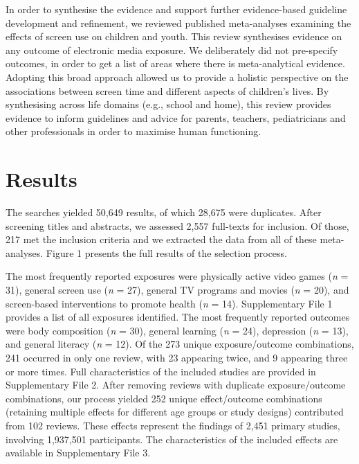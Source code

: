 \documentclass[
  english,
  man]{apa6}
\begin{document}
In order to synthesise the evidence and support further evidence-based guideline development and refinement, we reviewed published meta-analyses examining the effects of screen use on children and youth.
This review synthesises evidence on any outcome of electronic media exposure.
We deliberately did not pre-specify outcomes, in order to get a list of areas where there is meta-analytical evidence.
Adopting this broad approach allowed us to provide a holistic perspective on the associations between screen time and different aspects of children's lives.
By synthesising across life domains (e.g., school and home), this review provides evidence to inform guidelines and advice for parents, teachers, pediatricians and other professionals in order to maximise human functioning.

\newpage

\hypertarget{results}{%
\section{Results}\label{results}}

The searches yielded 50,649 results, of which 28,675 were duplicates.
After screening titles and abstracts, we assessed 2,557 full-texts for inclusion.
Of those, 217 met the inclusion criteria and we extracted the data from all of these meta-analyses.
Figure 1 presents the full results of the selection process.

The most frequently reported exposures were physically active video games (\emph{n} = 31), general screen use (\emph{n} = 27), general TV programs and movies (\emph{n} = 20), and screen-based interventions to promote health (\emph{n} = 14).
Supplementary File 1 provides a list of all exposures identified.
The most frequently reported outcomes were body composition (\emph{n} = 30), general learning (\emph{n} = 24), depression (\emph{n} = 13), and general literacy (\emph{n} = 12).
Of the 273 unique exposure/outcome combinations, 241 occurred in only one review, with 23 appearing twice, and 9 appearing three or more times.
Full characteristics of the included studies are provided in Supplementary File 2.
After removing reviews with duplicate exposure/outcome combinations, our process yielded 252 unique effect/outcome combinations (retaining multiple effects for different age groups or study designs) contributed from 102 reviews.
These effects represent the findings of 2,451 primary studies, involving 1,937,501 participants.
The characteristics of the included effects are available in Supplementary File 3.
\end{document}
